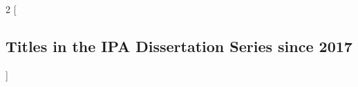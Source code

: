 %
%
%
%
%
%
%
%


\newcommand*{\promitem}[4]{\noindent \textbf{#1}. \emph{#2}. #3.~\mbox{#4}\medskip}

\clearpage \pagestyle{empty}

\setlength{\columnsep}{2em}
\begin{multicols}{2}
        [\subsection*{Titles in the IPA Dissertation Series since 2017}]












\end{multicols}
